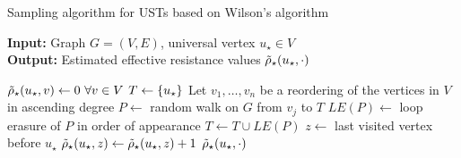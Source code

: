 \begin{algorithm}[t]
\footnotesize
{}
\caption{\footnotesize Sampling algorithm for USTs
based on Wilson's algorithm~\cite{DBLP:conf/stoc/Wilson96}}
\label{algo:wilson-ust}
\textbf{Input:} Graph $G = (V, E)$, universal vertex $u_\star\in V$\\
\textbf{Output:} Estimated effective resistance values
$\tilde{\rho}_{\star}(u_\star, \cdot)$

\begin{algorithmic}[1]
\State$\tilde{\rho}_{\star}(u_\star, v) \gets 0\ \forall v\in V$
\State$T \gets \set{u_\star}$\label{line:wilson-ust:pivot}
\State Let $v_1, \ldots, v_n$ be a reordering of the vertices in $V$ in ascending degree
\State$P \gets$ random walk on $G$ from $v_j$ to $T$
\State$LE(P) \gets$ loop erasure of $P$ in order of appearance
\State$T \gets T \cup LE(P)$
\State$z \gets$ last visited vertex before $u_\star$
\State$\tilde{\rho}_{\star}(u_\star, z) \gets \tilde{\rho}_{\star}(u_\star, z) + 1$
\EndIf
\EndFor
\State\Return$\tilde{\rho}_{\star}(u_\star, \cdot)$
\EndFunction
\end{algorithmic}
\end{algorithm}
